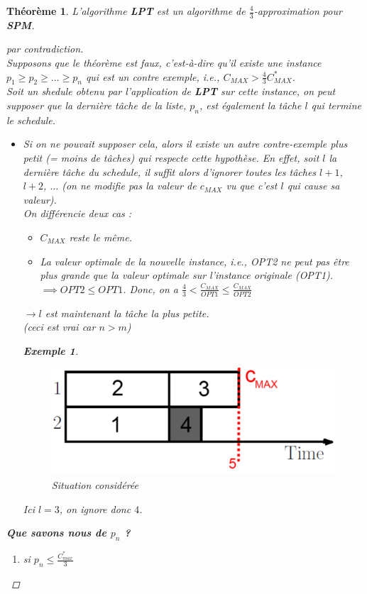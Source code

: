 \documentclass[12pt]{article}
\newcommand{\titre}[1]{\textcolor{title}{#1}}
\newtheorem{exemple}{Exemple}[section]
\newtheorem{thm}{Th\'eor\`eme}[section]
\newtheorem{proof}{Preuve}[section]
\begin{document}
\begin{thm} L'algorithme \textbf{LPT} est un algorithme de $\frac 4 3$-approximation pour \textbf{\titre{SPM}}.
\begin{proof}[par contradiction]$ $\\
Supposons que le théorème est faux, c'est-à-dire qu'il existe une instance $p_1\geq p_2\geq \ldots \geq p_n$ qui est un contre exemple, i.e., $C_{MAX} > \frac{4}{3} C^*_{MAX}$. \\
Soit un shedule obtenu par l'application de \textbf{LPT} sur cette instance, on peut supposer que la dernière tâche de la liste, $p_n$, est
également la tâche $l$ qui termine le schedule.
\begin{itemize}
\item[$\hookrightarrow$] Si on ne pouvait supposer cela, alors il existe un autre contre-exemple plus petit (= moins de tâches) qui
respecte cette hypothèse. En effet, soit $l$ la dernière tâche du schedule, il suffit alors d'ignorer toutes les tâches $l+1$, $l+2$,
$\ldots$ (on ne modifie pas la valeur de $c_{MAX}$ vu que c'est $l$ qui cause sa valeur).\\
On différencie deux cas :
\begin{itemize}
	\item $C_{MAX}$ reste le même.
	\item La valeur optimale de la nouvelle instance, i.e., OPT2 ne peut pas être
	plus grande que la valeur optimale sur l'instance originale (OPT1). \\
	$\implies OPT2 \leq OPT1$. Donc, on a $\frac{4}{3} < \frac{C_{MAX}}{OPT1} \leq
	\frac{C_{MAX}}{OPT2}$
\end{itemize}
	 $\rightarrow l$ est maintenant la tâche la plus petite. \\
	 \textit{(ceci est vrai car $n>m$)}
	 \begin{exemple}$ $
\begin{figure}[h!]
    \begin{center}
    \includegraphics[scale=0.3]{spm8.pdf}
    \caption{Situation considérée}
    \end{center}
\end{figure}
	Ici $l=3$, on ignore donc $4$.
	 \end{exemple}
\end{itemize}
\textbf{Que savons nous de $p_n$ ?}
\begin{enumerate}
\item[a)] si $p_n \leq \frac{C^*_{max}}{3}$


\end{enumerate}
\end{proof}
\end{thm}
\end{document}

